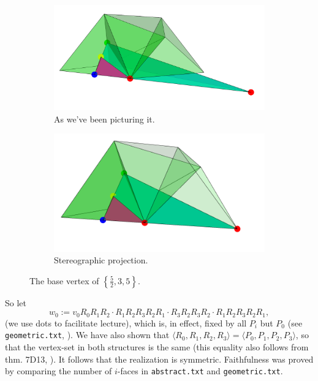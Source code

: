 \documentclass{article}
\theoremstyle{definition}
\begin{document}
		\begin{figure}[H]
		\begin{center}
			\begin{subfigure}{\linewidth}
				\centering
				\includegraphics[width=0.8\linewidth]{fig10a}
				\caption{As we've been picturing it.}\label{fig:10a}
			\end{subfigure}
			\begin{subfigure}{\linewidth}
				\centering
				\includegraphics[width=0.7\linewidth]{fig10b}
				\caption{Stereographic projection.}\label{fig:10b}
			\end{subfigure}
		\end{center}
		\caption{The base vertex of $\left\{\frac{5}{2},3,5\right\}$.}\label{fig:10}
	\end{figure}
	
	So let
		\begin{equation}\label{eq:w0}
			w_0:=v_0R_0R_1R_2\cdot R_1R_2R_3R_2R_1\cdot  R_3R_2R_3R_2\cdot R_1R_2R_3R_2R_1,
		\end{equation}
	(we use dots to facilitate lecture), which is, in effect, fixed by all $P_i$ but $P_0$ (see \texttt{geometric.txt}, ). We have also shown that $\langle R_0,R_1,R_2,R_3\rangle=\langle P_0,P_1,P_2,P_3\rangle$, so that the vertex-set in both structures is the same (this equality also follows from thm. 7D13, \cite{abstract-polytopes}). It follows that the realization is symmetric. Faithfulness was proved by comparing the number of $i$-faces in \texttt{abstract.txt} and \texttt{geometric.txt}.
	
\end{document}
